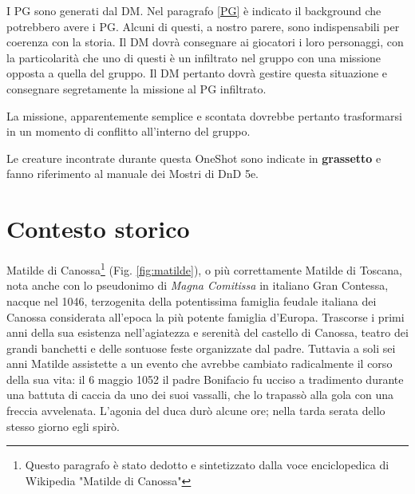 \documentclass[letterpaper,twocolumn,openany,nodeprecatedcode]{dndbook}
\begin{document}
I PG sono generati dal DM. Nel paragrafo \ref{PG} è indicato il background che potrebbero avere i PG. Alcuni di questi, a nostro parere, sono indispensabili per coerenza con la storia. Il DM dovrà consegnare ai giocatori i loro personaggi, con la particolarità che uno di questi è un infiltrato nel gruppo con una missione opposta a quella del gruppo. Il DM pertanto dovrà gestire questa situazione e consegnare segretamente la missione al PG infiltrato.

La missione, apparentemente semplice e scontata dovrebbe pertanto trasformarsi in un momento di conflitto all'interno del gruppo.

Le creature incontrate durante questa OneShot sono indicate in \textbf{grassetto} e fanno riferimento al manuale dei Mostri di DnD 5e\cite{dnd:mostri}.

\section{Contesto storico}


Matilde di Canossa\footnote{Questo paragrafo è stato dedotto e sintetizzato dalla voce enciclopedica di Wikipedia "Matilde di Canossa"} (Fig. \ref{fig:matilde})\cite{wiki:matilde}, o più correttamente Matilde di Toscana, nota anche con lo pseudonimo di \textit{Magna Comitissa} in italiano Gran Contessa, nacque nel 1046, terzogenita della potentissima famiglia feudale italiana dei Canossa considerata all'epoca la più potente famiglia d'Europa. Trascorse i primi anni della sua esistenza nell'agiatezza e serenità del castello di Canossa, teatro dei grandi banchetti e delle sontuose feste organizzate dal padre. Tuttavia a soli sei anni Matilde assistette a un evento che avrebbe cambiato radicalmente il corso della sua vita: il 6 maggio 1052 il padre Bonifacio fu ucciso a tradimento durante una battuta di caccia da uno dei suoi vassalli, che lo trapassò alla gola con una freccia avvelenata. L'agonia del duca durò alcune ore; nella tarda serata dello stesso giorno egli spirò.
\end{document}
